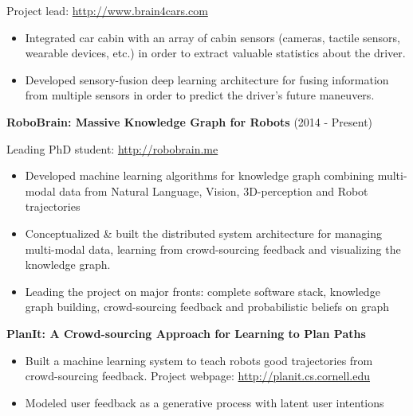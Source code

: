 \documentclass[line,margin]{res}
\begin{document}
\begin{resume}
 \vspace{-3mm}
  \hspace {4mm } Project lead: {\url{http://www.brain4cars.com}}
 \begin{itemize} \itemsep -2pt  %
\item Integrated car cabin with an array of cabin sensors (cameras, tactile sensors, wearable
devices, etc.) in order to extract valuable statistics about the driver.
\item Developed sensory-fusion deep learning architecture for fusing information from multiple sensors in order to predict the driver's future maneuvers.
 \end{itemize}
 
{\bf RoboBrain: Massive Knowledge Graph for Robots} \hfill (2014 - Present)
    
 \vspace{-3mm}
  \hspace {4mm } Leading PhD student: {\url{http://robobrain.me}}
 \begin{itemize} \itemsep -2pt  %
 \item Developed machine learning algorithms for knowledge graph combining
multi-modal data from Natural Language, Vision, 3D-perception and Robot
trajectories
\item Conceptualized \& built the distributed system architecture for managing multi-modal
data, learning from crowd-sourcing feedback and visualizing the knowledge graph. 
 \item Leading the project on major fronts: complete software stack,
knowledge graph building, crowd-sourcing feedback and probabilistic beliefs on
graph
 \end{itemize}




{\bf PlanIt: A Crowd-sourcing Approach for Learning to Plan Paths} 
    
 \begin{itemize} \itemsep -2pt  %
 \item Built a machine learning system to teach robots good trajectories from
crowd-sourcing feedback. Project webpage: {\url{http://planit.cs.cornell.edu}} 
 \item Modeled user feedback as a generative process with latent user intentions  
 \end{itemize}


\end{resume}
\end{document}
